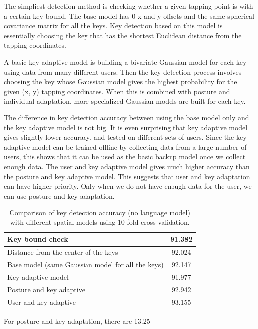 \documentclass{sigchi}
\begin{document}
The simpliest detection method is checking whether a given tapping point is
with a certain key bound. The base model has 0 x and y offsets and the same
spherical covariance matrix for all the keys. Key detection based on this model is essentially choosing the key that has the shortest Euclidean distance from the tapping coordinates.

A basic key adaptive model is building a bivariate Gaussian model for each key using data from many different users. Then the key detection process involves choosing the key whose Gaussian model gives the highest probability for the given (x, y) tapping coordinates. When this is combined with posture and individual adaptation, more specialized Gaussian models are built for each key.

The difference in key detection accuracy between using the base model only and
the key adaptive model is not big. It is even surprising that key adaptive model
gives slightly lower accuracy. and tested on different sets of users.
Since the key adaptive model can be trained offline by collecting data from a large number of users, this shows that it can be used as the basic backup model once we collect enough data. The user and key adaptive model gives much higher accuracy than the posture and key adaptive model. This suggests that user and key adaptation can have higher priority. Only when we do not have enough data for the user, we can use posture and key adaptation.

\begin{table} [tb]
  \centering
  \begin{tabular*}{0.5\textwidth}{ | l | c | }
    \hline
    Key bound check & 91.382 \\
    \hline
    Distance from the center of the keys & 92.024 \\
    \hline
    Base model (same Gaussian model for all the keys) & 92.147 \\
    \hline
    Key adaptive model  & 91.977 \\
    \hline
    Posture and key adaptive & 92.942 \\
    \hline
    User and key adaptive   & 93.155 \\
    \hline
  \end{tabular*}
  \caption{Comparison of key detection accuracy (no language model) with
  different spatial models using 10-fold cross validation.}
  \label{tab:comparison}
\end{table}


For posture and key adaptation, there are 13.25%
\end{document}
